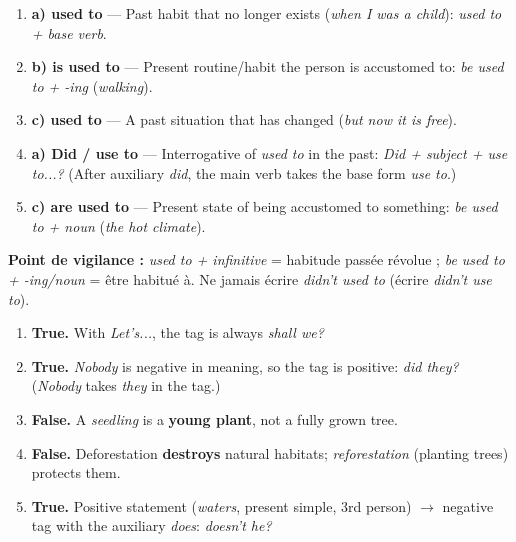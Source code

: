 \documentclass[11pt]{article}
\begin{document}
\begin{corrige}
\begin{enumerate}
    \item \textbf{a) used to} — Past habit that no longer exists (\emph{when I was a child}): \emph{used to + base verb}.
    \item \textbf{b) is used to} — Present routine/habit the person is accustomed to: \emph{be used to + -ing} (\emph{walking}).
    \item \textbf{c) used to} — A past situation that has changed (\emph{but now it is free}).
    \item \textbf{a) Did / use to} — Interrogative of \emph{used to} in the past: \emph{Did + subject + use to...?} (After auxiliary \emph{did}, the main verb takes the base form \emph{use to}.)
    \item \textbf{c) are used to} — Present state of being accustomed to something: \emph{be used to + noun} (\emph{the hot climate}).
\end{enumerate}
\textbf{Point de vigilance :} \emph{used to + infinitive} = habitude passée révolue ; \emph{be used to + -ing/noun} = être habitué à. Ne jamais écrire \emph{didn't used to} (écrire \emph{didn't use to}).
\end{corrige}

\begin{corrige}
\begin{enumerate}
    \item \textbf{True.} With \emph{Let's...}, the tag is always \emph{shall we?}
    \item \textbf{True.} \emph{Nobody} is negative in meaning, so the tag is positive: \emph{did they?} (\emph{Nobody} takes \emph{they} in the tag.)
    \item \textbf{False.} A \emph{seedling} is a \textbf{young plant}, not a fully grown tree.
    \item \textbf{False.} Deforestation \textbf{destroys} natural habitats; \emph{reforestation} (planting trees) protects them.
    \item \textbf{True.} Positive statement (\emph{waters}, present simple, 3rd person) $\rightarrow$ negative tag with the auxiliary \emph{does}: \emph{doesn't he?}
\end{enumerate}
\end{corrige}
\end{document}
